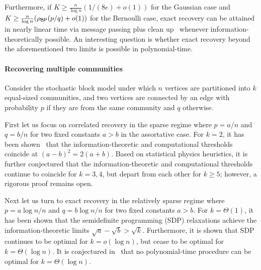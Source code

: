 Furthermore, if $K \geq \frac{n}{\log n} (1/(8e) + o(1))$ for the Gaussian case and $K \geq \frac{n}{\log n} (\rho_{\sf BP}(p/q) + o(1))$
for the Bernoulli case,
exact recovery can be attained in nearly linear time via message passing plus clean up~\cite{HajekWuXu_one_beyond_spectral15,HajekWuXu_MP_submat15} whenever information-theoretically possible. An interesting question is whether exact recovery
beyond the aforementioned two limits is possible in polynomial-time. 






\paragraph{Recovering multiple communities}
Consider the stochastic block model under which $n$ vertices are partitioned into $k$ equal-sized communities,
and two vertices are connected by an edge with probability $p$ if they are from the same community and
$q$ otherwise.  


First let us focus on correlated recovery in the sparse regime where $p=a/n$ and $q=b/n$ for two fixed constants $a>b$ 
in the assortative case. 
For $k=2$, it has been shown~\cite{Mossel12,Massoulie13,Mossel13} that the information-theoretic and computational thresholds 
coincide at $(a-b)^2=2(a+b)$. Based on statistical physics heuristics, it is further conjectured that the information-theoretic and computational thresholds
continue to coincide for $k=3,4$, but depart from each other for $k\ge 5$; however, a rigorous proof remains open.


Next let us turn to exact recovery in the relatively sparse regime where $p=a \log n/n$ and $q=b \log n/n$ for two fixed
constants $a>b$. For $k=\Theta(1)$, it has been shown that the semidefinite programming (SDP) relaxations achieve the information-theoretic limits $\sqrt{a}-\sqrt{b}>\sqrt{k}$. Furthermore, it is shown that SDP continues to be optimal for $k=o(\log n)$, but cease to be optimal
for $k=\Theta(\log n)$. It is conjectured in~\cite{ChenXu14} that no polynomial-time procedure can be optimal for $k=\Theta(\log n)$.


